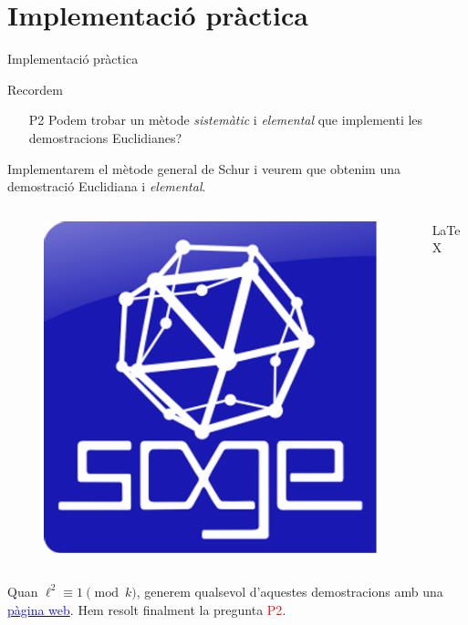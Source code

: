 \documentclass[11pt]{beamer}
\begin{document}
	\section{Implementació pràctica}
	\begin{frame}{Implementació pràctica}
		\begin{alertblock}{Recordem}
			\begin{itemize}
				\item[P2] Podem trobar un mètode \emph{sistemàtic} i \emph{elemental} que implementi les demostracions Euclidianes?\pause
			\end{itemize}
		\end{alertblock}
		Implementarem el mètode general de Schur i veurem que obtenim una demostració Euclidiana i \emph{elemental}.\pause
		\begin{columns}
			\begin{column}{0.5\textwidth}
				\begin{center}
					\begin{figure}[h!]
						\centering
						\includegraphics[width=0.4\linewidth]{Sage_logo}
					\end{figure} 
				\end{center}
			\end{column}
			\begin{column}{0.5\textwidth} 
				\begin{center}
					\Huge
					\LaTeX
				\end{center}
			\end{column}
		\end{columns}\pause
		\vspace{0.5cm}
		Quan $\ell^2\equiv 1\pmod{k}$, generem qualsevol d'aquestes demostracions amb una \href{http://167.172.185.115/}{\textcolor{blue}{pàgina web}}. \pause Hem resolt finalment la pregunta \textcolor{red}{P2}.\checkmark
	\end{frame}
	
\end{document}
